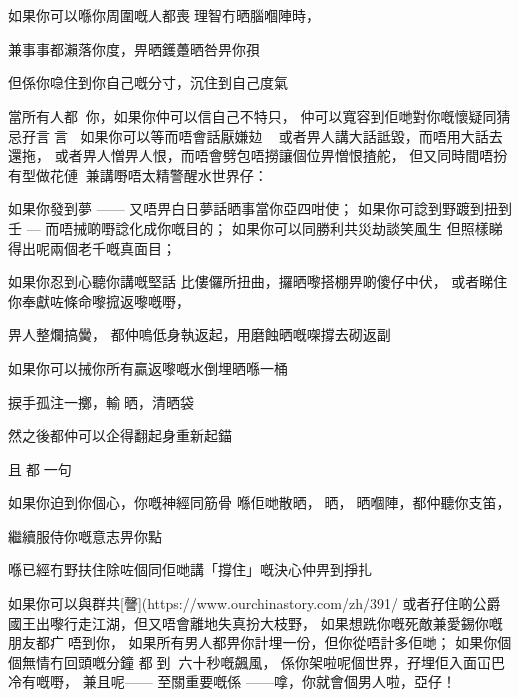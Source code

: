 \chapter{}
    
如果你可以喺你周圍嘅人都喪󱍚理智冇晒腦嗰陣時，

兼事事都瀨落你度，畀晒鑊躉晒咎畀你孭

但係你喼住到你自己嘅分寸，沉住到自己度氣

當所有人都你，如果你仲可以信自己不特只，
仲可以寬容到佢哋對你嘅懷疑同猜忌孖言言；
如果你可以等而唔會話厭嫌攰，
或者畀人講大話詆毀，而唔用大話去還拖，
或者畀人憎畀人恨，而唔會劈包唔撈讓個位畀憎恨揸舵，
但又同時間唔扮有型做花僆，兼講嘢唔太精警醒水世界仔：

如果你發到夢 —— 又唔畀白日夢話晒事當你亞四咁使；
如果你可諗到野踱到扭到壬 — 而唔𢬿啲嘢諗化成你嘅目的；
如果你可以同勝利共災劫談笑風生
但照樣睇得出呢兩個老千嘅真面目；

如果你忍到心聽你講嘅堅話
比僂儸所扭曲，攞晒嚟搭棚畀啲傻仔中伏，
或者睇住你奉獻咗條命嚟搲返嚟嘅嘢，

畀人整爛搞黌，
都仲嗚低身執返起，用磨蝕晒嘅㗎撐去砌返副󱜙：

如果你可以𢬿你所有贏返嚟嘅水倒埋晒喺一桶

捩手孤注一擲，輸晒，清晒袋

然之後都仲可以企得翻起身重新起錨

且都一句

如果你迫到你個心，你嘅神經同筋骨
喺佢哋散晒，晒，󰐙晒嗰陣，都仲聽你支笛，

繼續服侍你嘅意志畀你點

喺已經冇野扶住除咗個同佢哋講「撐住」嘅決心仲畀到掙扎

如果你可以與群共[謦](https://www.ourchinastory.com/zh/391/%
或者孖住啲公爵國王出嚟行走江湖，但又唔會離地失真扮大枝野，
如果想跣你嘅死敵兼愛錫你嘅朋友都疒唔到你，
如果所有男人都畀你計埋一份，但你從唔計多佢哋；
如果你個個無情冇回頭嘅分鐘
都到六十秒嘅飆風，
係你架啦呢個世界，孖埋佢入面冚巴冷有嘅嘢，
兼且呢—— 至關重要嘅係 ——嗱，你就會個男人啦，亞仔！
    
    